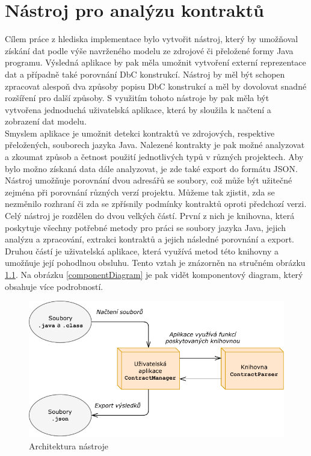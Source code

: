 \chapter{Nástroj pro analýzu kontraktů}
	Cílem práce z hlediska implementace bylo vytvořit nástroj, který by umožňoval získání dat podle výše navrženého modelu ze zdrojové či přeložené formy Java programu. Výsledná aplikace by pak měla umožnit vytvoření externí reprezentace dat a případně také porovnání DbC konstrukcí. Nástroj by měl být schopen zpracovat alespoň dva způsoby popisu DbC konstrukcí a měl by dovolovat snadné rozšíření pro další způsoby. S využitím tohoto nástroje by pak měla být vytvořena jednoduchá uživatelská aplikace, která by sloužila k načtení a zobrazení dat modelu.\\
	
	Smyslem aplikace je umožnit detekci kontraktů ve zdrojových, respektive přeložených, souborech jazyka Java. Nalezené kontrakty je pak možné analyzovat a zkoumat způsob a četnost použití jednotlivých typů v různých projektech. Aby bylo možno získaná data dále analyzovat, je zde také export do formátu JSON. Nástroj umožňuje porovnání dvou adresářů se soubory, což může být užitečné zejména při porovnání různých verzí projektu. Můžeme tak zjistit, zda se nezměnilo rozhraní či zda se zpřísnily podmínky kontraktů oproti předchozí verzi.\\
	
	Celý nástroj je rozdělen do dvou velkých částí. První z nich je knihovna, která poskytuje všechny potřebné metody pro práci se soubory jazyka Java, jejich analýzu a zpracování, extrakci kontraktů a jejich následné porovnání a export. Druhou částí je uživatelská aplikace, která využívá metod této knihovny a umožňuje její pohodlnou obsluhu. Tento vztah je znázorněn na stručném obrázku \ref{globalArchitecture}. Na obrázku \ref{componentDiagram} je pak vidět komponentový diagram, který obsahuje více podrobností.
					
	\begin{figure}[!htb]
			\centering
			\includegraphics{img/globalArchitecture.pdf}
			\caption[globalArchitecture]{Architektura nástroje}
			\label{globalArchitecture}
		\endminipage\hfill
	\end{figure}
	
